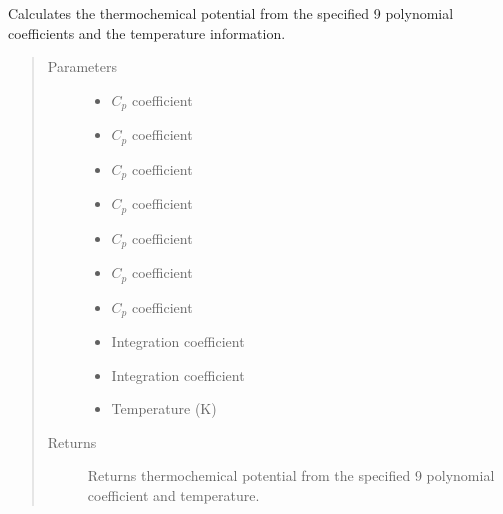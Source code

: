 \documentclass[letterpaper,10pt,english]{sphinxmanual}
\begin{document}
\begin{fulllineitems}
Calculates the thermochemical potential from the specified 9 polynomial
coefficients and the temperature information.
\begin{quote}\begin{description}
\item[{Parameters}] \leavevmode\begin{itemize}
\item {} 
 \textendash{} \(C_p\) coefficient

\item {} 
 \textendash{} \(C_p\) coefficient

\item {} 
 \textendash{} \(C_p\) coefficient

\item {} 
 \textendash{} \(C_p\) coefficient

\item {} 
 \textendash{} \(C_p\) coefficient

\item {} 
 \textendash{} \(C_p\) coefficient

\item {} 
 \textendash{} \(C_p\) coefficient

\item {} 
 \textendash{} Integration coefficient

\item {} 
 \textendash{} Integration coefficient

\item {} 
 \textendash{} Temperature (K)

\end{itemize}

\item[{Returns}] \leavevmode
Returns thermochemical potential from the specified 9 polynomial coefficient and temperature.

\end{description}\end{quote}

\end{fulllineitems}
\end{document}
